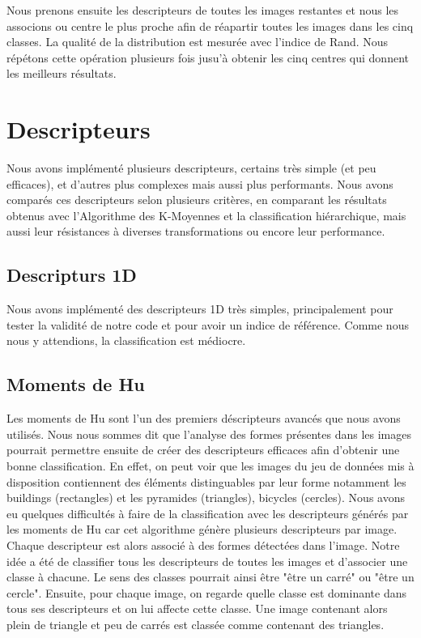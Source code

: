 \documentclass[12pt,a4paper,utf8x]{report}
\begin{document}
    Nous prenons ensuite les descripteurs de toutes les images restantes et nous les associons ou centre le plus proche afin de réapartir toutes les images dans les cinq classes. La qualité de la distribution est mesurée avec l'indice de Rand. Nous répétons cette opération plusieurs fois jusu'à obtenir les cinq centres qui donnent les meilleurs résultats.
    

\chapter{Descripteurs}
    Nous avons implémenté plusieurs descripteurs, certains très simple (et peu efficaces), et d'autres plus complexes mais aussi plus performants. Nous avons comparés ces descripteurs selon plusieurs critères, en comparant les résultats obtenus avec l'Algorithme des K-Moyennes et la classification hiérarchique, mais aussi leur résistances à diverses transformations ou encore leur performance.

    \section{Descripturs 1D}
        Nous avons implémenté des descripteurs 1D très simples, principalement pour tester la validité de notre code et pour avoir un indice de référence. Comme nous nous y attendions, la classification est médiocre.

    \section{Moments de Hu}

        Les moments de Hu sont l'un des premiers déscripteurs avancés que nous avons utilisés. Nous nous sommes dit que l'analyse des formes présentes dans les images pourrait permettre ensuite de créer des descripteurs efficaces afin d'obtenir une bonne classification. En effet, on peut voir que les images du jeu de données mis à disposition contiennent des éléments distinguables par leur forme notamment les buildings (rectangles) et les pyramides (triangles), bicycles (cercles). Nous avons eu quelques difficultés à faire de la classification avec les descripteurs générés par les moments de Hu car cet algorithme génère plusieurs descripteurs par image. Chaque descripteur est alors associé à des formes détectées dans l'image. Notre idée a été de classifier tous les descripteurs de toutes les images et d'associer une classe à chacune. Le sens des classes pourrait ainsi être "être un carré" ou "être un cercle". Ensuite, pour chaque image, on regarde quelle classe est dominante dans tous ses descripteurs et on lui affecte cette classe. Une image contenant alors plein de triangle et peu de carrés est classée comme contenant des triangles.
\end{document}
